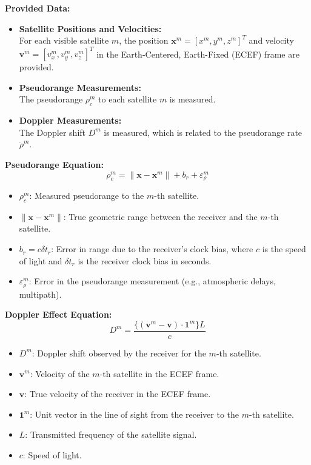 \documentclass[conference]{IEEEtran}
\begin{document}
\textbf{Provided Data:}
\begin{itemize}
    \item \textbf{Satellite Positions and Velocities:} \\
    For each visible satellite \( m \), the position \( \mathbf{x}^m = [x^m, y^m, z^m]^T \) and velocity \( \mathbf{v}^m = [v_x^m, v_y^m, v_z^m]^T \) in the Earth-Centered, Earth-Fixed (ECEF) frame are provided.
    
    \item \textbf{Pseudorange Measurements:} \\
    The pseudorange \( \rho_c^m \) to each satellite \( m \) is measured.
    
    \item \textbf{Doppler Measurements:} \\
    The Doppler shift \( D^m \) is measured, which is related to the pseudorange rate \( \dot{\rho}^m \).
\end{itemize}

\textbf{Pseudorange Equation:}
\begin{equation}
\rho_c^m = \|\mathbf{x} - \mathbf{x}^m\| + b_r + \varepsilon_\rho^m
\end{equation}
\begin{itemize}
    \item \( \rho_c^m \): Measured pseudorange to the \( m \)-th satellite.
    \item \( \|\mathbf{x} - \mathbf{x}^m\| \): True geometric range between the receiver and the \( m \)-th satellite.
    \item \( b_r = c\delta t_r \): Error in range due to the receiver's clock bias, where \( c \) is the speed of light and \( \delta t_r \) is the receiver clock bias in seconds.
    \item \( \varepsilon_\rho^m \): Error in the pseudorange measurement (e.g., atmospheric delays, multipath).
\end{itemize}

\textbf{Doppler Effect Equation:}
\begin{equation}
D^m = \frac{\{(\mathbf{v}^m - \mathbf{v}) \cdot \mathbf{1}^m\} L}{c}
\end{equation}
\begin{itemize}
    \item \( D^m \): Doppler shift observed by the receiver for the \( m \)-th satellite.
    \item \( \mathbf{v}^m \): Velocity of the \( m \)-th satellite in the ECEF frame.
    \item \( \mathbf{v} \): True velocity of the receiver in the ECEF frame.
    \item \( \mathbf{1}^m \): Unit vector in the line of sight from the receiver to the \( m \)-th satellite.
    \item \( L \): Transmitted frequency of the satellite signal.
    \item \( c \): Speed of light.
\end{itemize}
\end{document}
